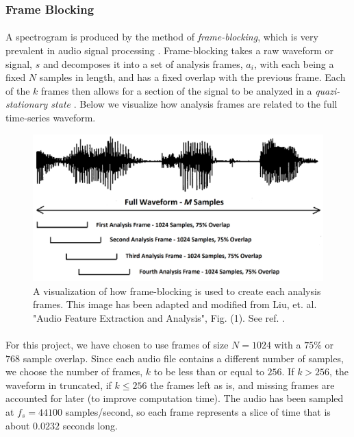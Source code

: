 \documentclass[12pt,letterpaper]{article}
\begin{document}

\subsubsection{Frame Blocking}
\label{subsubsec-FrameBlocking}

\paragraph*{}A spectrogram is produced by the method of \textit{frame-blocking}, which is very prevalent in audio signal processing \cite{Liu,Zhang}. Frame-blocking takes a raw waveform or signal, $s$ and decomposes it into a set of analysis frames, $a_i$, with each being a fixed $N$ samples in length, and has a fixed overlap with the previous frame. Each of the $k$ frames then allows for a section of the signal to be analyzed in a \textit{quazi-stationary state} \cite{Khan,Serizel}. Below we visualize how analysis frames are related to the full time-series waveform. 

\begin{figure}[H]
\begin{center}
\includegraphics[scale=0.45]{../Figures/AnalysisFrames}
\end{center}
\caption{A visualization of how frame-blocking is used to create each analysis frames. This image has been adapted and modified from Liu, et. al. "Audio Feature Extraction and Analysis", Fig. (1). See ref. \cite{Liu}.}
\label{fig-AnalysisFrames}
\end{figure}

\paragraph*{}For this project, we have chosen to use frames of size $N = 1024$ with a $75\%$ or $768$ sample overlap. Since each audio file contains a different number of samples, we choose the number of frames, $k$ to be less than or equal to $256$. If $k > 256$, the waveform in truncated, if $k \leq 256$ the frames left as is, and missing frames are accounted for later (to improve computation time). The audio has been sampled at $f_s = 44100$ samples/second, so each frame represents a slice of time that is about $0.0232$ seconds long.
\end{document}
